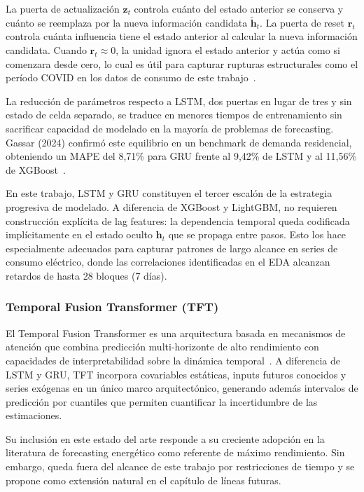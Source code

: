 \documentclass[12pt, a4paper]{article}
\begin{document}
La puerta de actualización $\mathbf{z}_t$ controla cuánto del estado anterior se conserva y cuánto se reemplaza por la nueva información candidata $\tilde{\mathbf{h}}_t$. La puerta de reset $\mathbf{r}_t$ controla cuánta influencia tiene el estado anterior al calcular la nueva información candidata. Cuando $\mathbf{r}_t \approx 0$, la unidad ignora el estado anterior y actúa como si comenzara desde cero, lo cual es útil para capturar rupturas estructurales como el período COVID en los datos de consumo de este trabajo~\cite{cho2014}.

La reducción de parámetros respecto a LSTM, dos puertas en lugar de tres y sin estado de celda separado, se traduce en menores tiempos de entrenamiento sin sacrificar capacidad de modelado en la mayoría de problemas de forecasting. Gassar (2024) confirmó este equilibrio en un benchmark de demanda residencial, obteniendo un MAPE del 8,71\% para GRU frente al 9,42\% de LSTM y al 11,56\% de XGBoost~\cite{gassar2024}.

En este trabajo, LSTM y GRU constituyen el tercer escalón de la estrategia progresiva de modelado. A diferencia de XGBoost y LightGBM, no requieren construcción explícita de lag features: la dependencia temporal queda codificada implícitamente en el estado oculto $\mathbf{h}_t$ que se propaga entre pasos. Esto los hace especialmente adecuados para capturar patrones de largo alcance en series de consumo eléctrico, donde las correlaciones identificadas en el EDA alcanzan retardos de hasta 28 bloques (7 días).

\subsubsection{Temporal Fusion Transformer (TFT)}

El Temporal Fusion Transformer es una arquitectura basada en mecanismos de atención que combina predicción multi-horizonte de alto rendimiento con capacidades de interpretabilidad sobre la dinámica temporal~\cite{lim2021}. A diferencia de LSTM y GRU, TFT incorpora covariables estáticas, inputs futuros conocidos y series exógenas en un único marco arquitectónico, generando además intervalos de predicción por cuantiles que permiten cuantificar la incertidumbre de las estimaciones.

Su inclusión en este estado del arte responde a su creciente adopción en la literatura de forecasting energético como referente de máximo rendimiento. Sin embargo, queda fuera del alcance de este trabajo por restricciones de tiempo y se propone como extensión natural en el capítulo de líneas futuras.
\end{document}
